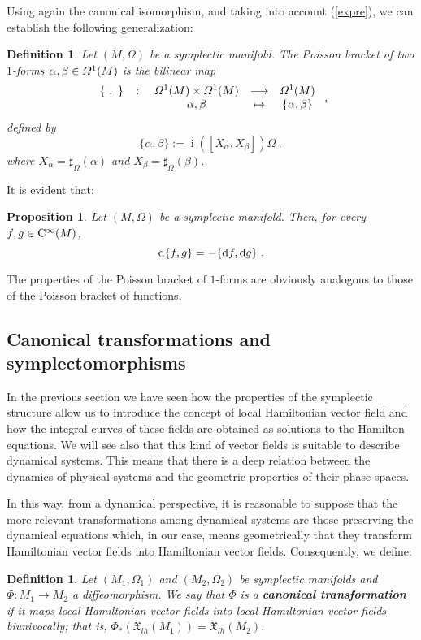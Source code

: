 \documentclass[12pt]{report}
\newtheorem{prop}[teor]{Proposition}
\newtheorem{definition}[teor]{Definition}
\def\vf{\mathfrak X}
\def\df{{\mit\Omega}}
\def\d{{\rm d}}
\def\inn{\mathop{i}\nolimits}
\def\Cinfty{{\rm C}^\infty}
\begin{document}
Using again the canonical isomorphism,
and taking into account (\ref{expre}),
we can establish the following generalization:

\begin{definition}
Let $(M,\Omega )$ be a symplectic manifold.
The {\sl Poisson bracket} of two $1$-forms 
$\alpha ,\beta \in {\mit\Omega}^1 (M)$
is the bilinear map
$$
\begin{array}{ccccc}
\{\ ,\ \} & \colon &
{\mit\Omega}^1 (M)\times{\mit\Omega}^1(M)&\longrightarrow&\df^1 (M)
\\
& & \alpha ,\beta & \mapsto & \{ \alpha ,\beta \}
\end{array} \ ,
$$
defined by
$$
\{ \alpha ,\beta \} := \inn([X_\alpha,X_\beta ])\Omega \ ,
$$
where $X_\alpha = \sharp_\Omega (\alpha )$
and $X_\beta = \sharp_\Omega (\beta )$.
\end{definition}

It is evident that:

\begin{prop}
Let $(M,\Omega )$ be a symplectic manifold. Then,
for every $f,g \in  \Cinfty (M)$,
$$
\d \{ f,g \} = -\{ \d f,\d g \} \ .
$$
\end{prop}

The properties of the Poisson bracket of $1$-forms
are obviously analogous to those of the Poisson bracket of functions.


\subsection{Canonical transformations and symplectomorphisms}
\protect\label{tcs}


In the previous section we have seen how the properties 
of the symplectic structure allow us to introduce the concept of
local Hamiltonian vector field and how the
integral curves of these fields are obtained 
as solutions to the Hamilton equations.
We will see also that this kind of vector fields is suitable
to describe dynamical systems.
This means that there is a deep relation between the dynamics
of physical systems and the geometric properties of 
their phase spaces.

In this way, from a dynamical perspective,
it is reasonable to suppose that the more relevant transformations
among dynamical systems are those preserving the dynamical equations
which, in our case, means geometrically 
that they transform Hamiltonian vector fields into Hamiltonian vector fields.
Consequently, we define:

\begin{definition}
Let $(M_1,\Omega_1)$ and $(M_2,\Omega_2)$ be
symplectic manifolds and $\Phi:M_{1}\to M_{2}$ a diffeomorphism.
We say that
$\Phi$ is a \textbf{canonical transformation} 
if it maps local Hamiltonian vector fields into
local Hamiltonian vector fields biunivocally; that is,
$\Phi_*(\vf_{lh} (M_1)) = \vf_{lh}(M_2)$.
\end{definition}
\end{document}
